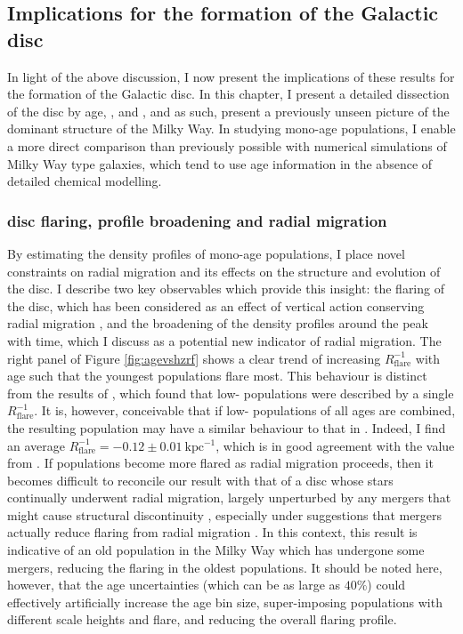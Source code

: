 \subsection{Implications for the formation of the Galactic disc}
\label{sec:implications}

In light of the above discussion, I now present the implications of these results for the formation of the Galactic disc. In this chapter, I present a detailed dissection of the disc by age, \feh{}, and \afe{}, and as such, present a previously unseen picture of the dominant structure of the Milky Way. In studying mono-age populations, I enable a more direct comparison than previously possible with numerical simulations of Milky Way type galaxies, which tend to use age information in the absence of detailed chemical modelling.

\subsubsection{disc flaring, profile broadening and radial migration}

By estimating the density profiles of mono-age populations, I  place novel constraints on radial migration and its effects on the structure and evolution of the disc. I describe two key observables which provide this insight: the flaring of the disc, which has been considered as an effect of vertical action conserving radial migration \citep[where stars have greater vertical excursions as they migrate outward, e.g.][]{2012A&A...548A.127M}, and the broadening of the density profiles around the peak with time, which I discuss as a potential new indicator of radial migration. The right panel of Figure \ref{fig:agevshzrf} shows a clear trend of increasing $R_{\mathrm{flare}}^{-1}$ with age such that the youngest populations flare most. This behaviour is distinct from the results of \citet{2016ApJ...823...30B}, which found that low-\afe{} populations were described by a single $R_{\mathrm{flare}}^{-1}$. It is, however, conceivable that if low-\afe{} populations of all ages are combined, the resulting population may have a similar behaviour to that in \citet{2016ApJ...823...30B}. Indeed, I find an average $R_{\mathrm{flare}}^{-1} = -0.12\pm 0.01\ \mathrm{kpc^{-1}}$, which is in good agreement with the value from \citet{2016ApJ...823...30B}. If populations become more flared as radial migration proceeds, then it becomes difficult to reconcile our result with that of a disc whose stars continually underwent radial migration, largely unperturbed by any mergers that might cause structural discontinuity \citep[e.g.][]{2014MNRAS.442.2474M}, especially under suggestions that mergers actually reduce flaring from radial migration \citep[e.g.][]{2014A&A...572A..92M}. In this context, this result is indicative of an old population in the Milky Way which has undergone some mergers, reducing the flaring in the oldest populations. It should be noted here, however, that the age uncertainties (which can be as large as $40\%$) could effectively artificially increase the age bin size, super-imposing populations with different scale heights and flare, and reducing the overall flaring profile.

